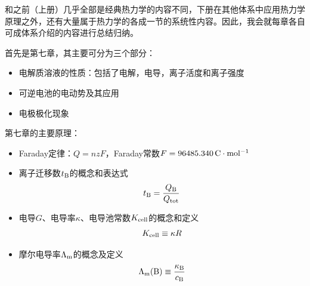 \documentclass[9pt]{beamer}
\newcommand\B{{\rm B}}
\newcommand\m{{\rm m}}
\begin{document}
	\begin{frame}
	
	{\color{blue}和之前（上册）几乎全部是经典热力学的内容不同，下册在其他体系中应用热力学原理之外，还有大量属于热力学的各成一节的系统性内容。因此，我会就每章各自可成体系介绍的内容进行总结归纳。}
	
	首先是第七章，其主要可分为三个部分：
	\begin{itemize}
	
	\item 电解质溶液的性质：包括了电解，电导，离子活度和离子强度
	
	\item 可逆电池的电动势及其应用
	
	\item 电极极化现象	
	
	\end{itemize}		
	
	第七章的主要原理：	
	\begin{itemize}
	
	\item Faraday定律：$Q=nzF$，Faraday常数$F=96485.340 \,{\rm C \cdot mol^{-1} }$
	
	\item 离子迁移数$t_\B$的概念和表达式
	\[
		t_\B = \frac{ Q_\B }{ Q_{\rm tot} }
	\]
	
	\item 电导$G$、电导率$\kappa$、电导池常数$K_{\rm cell}$的概念和定义
	\[
		K_{\rm cell} \equiv \kappa R
	\]
	
	\item 摩尔电导率$\Lambda_\m$的概念及定义
	\[
		\Lambda_\m(\B) \equiv \frac{ \kappa_\B }{ c_\B }
	\]
	
	\end{itemize}
	
	\end{frame}
	
\end{document}
